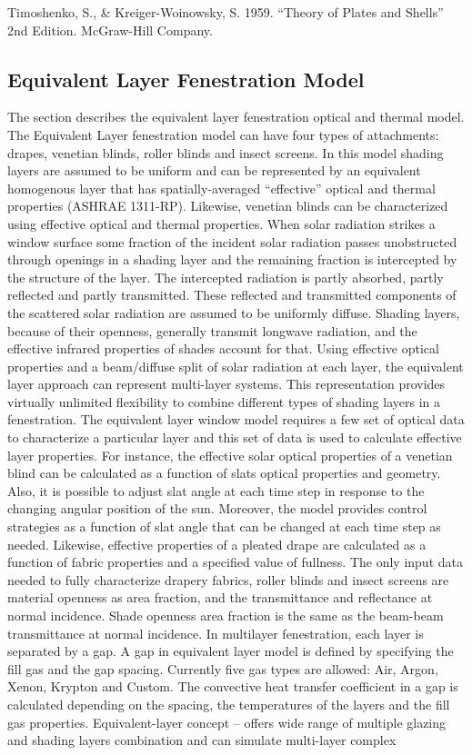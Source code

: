 Timoshenko, S., \& Kreiger-Woinowsky, S. 1959. ``Theory of Plates and Shells'' 2nd Edition. McGraw-Hill Company.

\subsection{Equivalent Layer Fenestration Model}\label{equivalent-layer-fenestration-model}

The section describes the equivalent layer fenestration optical and thermal model. The Equivalent Layer fenestration model can have four types of attachments: drapes, venetian blinds, roller blinds and insect screens. In this model shading layers are assumed to be uniform and can be represented by an equivalent homogenous layer that has spatially-averaged ``effective'' optical and thermal properties (ASHRAE 1311-RP). Likewise, venetian blinds can be characterized using effective optical and thermal properties. When solar radiation strikes a window surface some fraction of the incident solar radiation passes unobstructed through openings in a shading layer and the remaining fraction is intercepted by the structure of the layer. The intercepted radiation is partly absorbed, partly reflected and partly transmitted. These reflected and transmitted components of the scattered solar radiation are assumed to be uniformly diffuse. Shading layers, because of their openness, generally transmit longwave radiation, and the effective infrared properties of shades account for that. Using effective optical properties and a beam/diffuse split of solar radiation at each layer, the equivalent layer approach can represent multi-layer systems. This representation provides virtually unlimited flexibility to combine different types of shading layers in a fenestration. The equivalent layer window model requires a few set of optical data to characterize a particular layer and this set of data is used to calculate effective layer properties. For instance, the effective solar optical properties of a venetian blind can be calculated as a function of slats optical properties and geometry. Also, it is possible to adjust slat angle at each time step in response to the changing angular position of the sun. Moreover, the model provides control strategies as a function of slat angle that can be changed at each time step as needed. Likewise, effective properties of a pleated drape are calculated as a function of fabric properties and a specified value of fullness. The only input data needed to fully characterize drapery fabrics, roller blinds and insect screens are material openness as area fraction, and the transmittance and reflectance at normal incidence. Shade openness area fraction is the same as the beam-beam transmittance at normal incidence. In multilayer fenestration, each layer is separated by a gap. A gap in equivalent layer model is defined by specifying the fill gas and the gap spacing. Currently five gas types are allowed: Air, Argon, Xenon, Krypton and Custom. The convective heat transfer coefficient in a gap is calculated depending on the spacing, the temperatures of the layers and the fill gas properties. Equivalent-layer concept -- offers wide range of multiple glazing and shading layers combination and can simulate multi-layer complex 